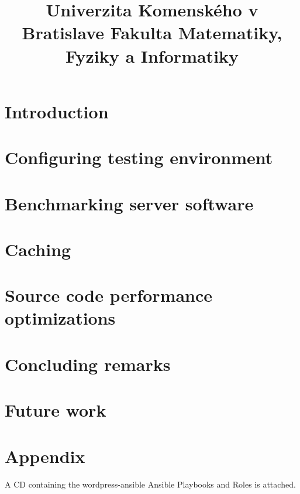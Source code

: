 \documentclass[12pt,a4paper]{bachelor}
\title{Univerzita Komenského v Bratislave Fakulta Matematiky, Fyziky a Informatiky}
\author{\autor}
\begin{document}



\printglossaries


\tableofcontents
\listoffigures

\newpage


\chapter{Introduction}


\chapter{Configuring testing environment}


\chapter{Benchmarking server software}


\chapter{Caching}


\chapter{Source code performance optimizations}


\chapter{Concluding remarks}


\chapter{Future work}


\printbibliography
{}

\chapter*{Appendix}
A CD containing the wordpress-ansible Ansible Playbooks and Roles is attached.

\label{totalpages}
\end{document}
